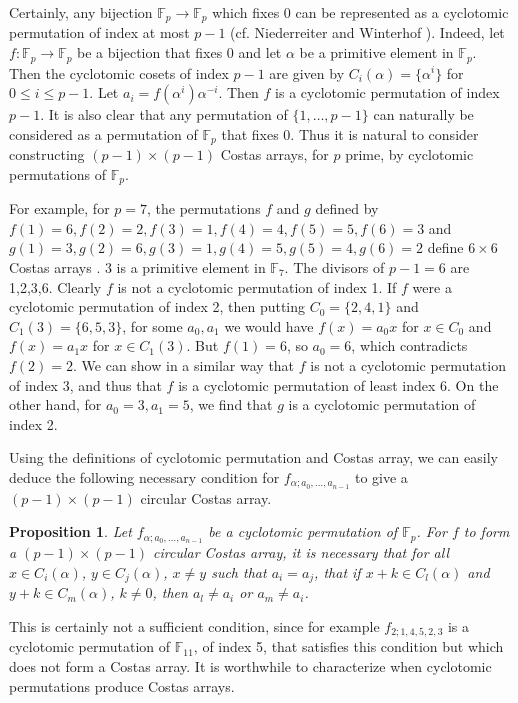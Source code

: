 \documentclass[10pt]{amsart}
\newtheorem{proposition}[theorem]{Proposition}
\begin{document}
Certainly, any bijection $\mathbb{F}_p \to \mathbb{F}_p$ which
fixes 0 can be represented as a cyclotomic permutation of index at most
$p-1$  (cf. Niederreiter and Winterhof
\cite{MR2143454}). Indeed, let $f:\mathbb{F}_p \to \mathbb{F}_p$ be a
bijection
that
fixes 0 and let $\alpha$ be a primitive element in $\mathbb{F}_p$. Then the
cyclotomic cosets of index $p-1$
are given by $C_i(\alpha)=\{\alpha^i\}$ for $0 \leq i
\leq p-1$. Let $a_i=f(\alpha^i)\alpha^{-i}$. Then $f$ is a
cyclotomic permutation of index $p-1$. It is also clear that any
permutation of $\{1,\ldots,p-1\}$ can naturally be considered as
a permutation of $\mathbb{F}_p$ that fixes 0. Thus it is natural
to consider constructing $(p-1) \times (p-1)$ Costas arrays, for
$p$ prime, by cyclotomic permutations of $\mathbb{F}_p$.

For example, for $p=7$, the permutations $f$ and $g$ defined by $f(1)=6, f(2)=2, f(3)=1, f(4)=4,
f(5)=5, f(6)=3$ and $g(1)=3,g(2)=6,g(3)=1,g(4)=5,g(5)=4,g(6)=2$ define
$6 \times 6$ Costas arrays \cite{MR749508}. 3 is a primitive
element in $\mathbb{F}_7$. The divisors of $p-1=6$ are 1,2,3,6. Clearly $f$ is not a cyclotomic
permutation of index 1. If $f$ were a cyclotomic permutation of index 2, then
putting $C_0=\{2,4,1\}$ and $C_1(3)=\{6,5,3\}$, for some $a_0,a_1$ we would have
$f(x)=a_0x$ for $x \in
C_0$
and $f(x)=a_1x$ for $x \in C_1(3)$.
But $f(1)=6$, so $a_0=6$, which contradicts
$f(2)=2$. We can show in a similar way that $f$ is not a cyclotomic
permutation of index 3, and thus that $f$ is a cyclotomic permutation of least
index 6. On the other hand, for $a_0=3,a_1=5$, we find that $g$ is a cyclotomic
permutation of index 2.

Using the definitions of cyclotomic permutation and Costas array, we
can easily deduce the following necessary condition for
$f_{\alpha;a_0,\ldots,a_{n-1}}$ to give a $(p-1)\times (p-1)$ circular Costas
array.

\begin{proposition}
Let $f_{\alpha;a_0,\ldots,a_{n-1}}$ be a cyclotomic permutation of
$\mathbb{F}_p$. For $f$ to form a $(p-1) \times (p-1)$ circular Costas array,
it is necessary that for all $x\in C_i(\alpha)$, $y\in C_j(\alpha)$, $x\neq y$
such that $a_i = a_j$, that if $x+k \in
C_l(\alpha)$ and $y+k \in C_m(\alpha)$, $k\neq 0$, then $a_l \neq a_i$ or $a_m \neq a_i$.
\end{proposition}


 This is certainly not a sufficient condition, since for
example $f_{2;1,4,5,2,3}$ is a cyclotomic permutation of
$\mathbb{F}_{11}$, of index 5, that satisfies this condition but
which does not form a Costas array. It is worthwhile to
characterize when cyclotomic permutations produce Costas arrays.
\end{document}
